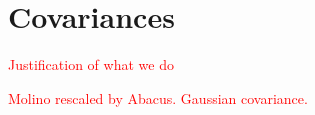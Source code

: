 \section{Covariances}
\label{sec:covariances}

\textcolor{red}{Justification of what we do}

\textcolor{red}{Molino rescaled by Abacus. Gaussian covariance.}